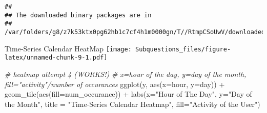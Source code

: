\documentclass[
]{article}
\newenvironment{Shaded}{\begin{snugshade}}{\end{snugshade}}
\newcommand{\AttributeTok}[1]{\textcolor[rgb]{0.77,0.63,0.00}{#1}}
\newcommand{\CommentTok}[1]{\textcolor[rgb]{0.56,0.35,0.01}{\textit{#1}}}
\newcommand{\DecValTok}[1]{\textcolor[rgb]{0.00,0.00,0.81}{#1}}
\newcommand{\FunctionTok}[1]{\textcolor[rgb]{0.00,0.00,0.00}{#1}}
\newcommand{\NormalTok}[1]{#1}
\newcommand{\OtherTok}[1]{\textcolor[rgb]{0.56,0.35,0.01}{#1}}
\newcommand{\SpecialCharTok}[1]{\textcolor[rgb]{0.00,0.00,0.00}{#1}}
\newcommand{\StringTok}[1]{\textcolor[rgb]{0.31,0.60,0.02}{#1}}
\begin{document}
\begin{verbatim}
## 
## The downloaded binary packages are in
##  /var/folders/g8/z7k53ktx0pg62hb1c7cf4h1m0000gn/T//RtmpCSoUwV/downloaded_packages
\end{verbatim}

\begin{Shaded}
\end{Shaded}

Time-Series Calendar HeatMap
\texttt{[image: Subquestions\_files/figure-latex/unnamed-chunk-9-1.pdf]}

\begin{Shaded}
\begin{Highlighting}[]
\CommentTok{\# heatmap attempt 4 (WORKS!)}
\CommentTok{\# x=hour of the day, y=day of the month, fill="activity"/number of occurances}
\FunctionTok{ggplot}\NormalTok{(y, }\FunctionTok{aes}\NormalTok{(}\AttributeTok{x=}\NormalTok{hour, }\AttributeTok{y=}\NormalTok{day)) }\SpecialCharTok{+} \FunctionTok{geom\_tile}\NormalTok{(}\FunctionTok{aes}\NormalTok{(}\AttributeTok{fill=}\NormalTok{num\_occurance)) }\SpecialCharTok{+}
  \FunctionTok{labs}\NormalTok{(}\AttributeTok{x=}\StringTok{"Hour of The Day"}\NormalTok{,}
       \AttributeTok{y=}\StringTok{"Day of the Month"}\NormalTok{,}
       \AttributeTok{title =} \StringTok{"Time{-}Series Calendar Heatmap"}\NormalTok{, }
       \AttributeTok{fill=}\StringTok{"Activity of the User"}\NormalTok{)}
\end{Highlighting}
\end{Shaded}
\end{document}

